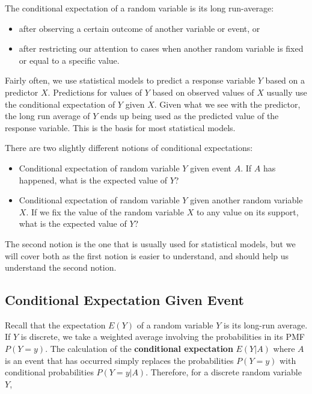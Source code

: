 \documentclass[
]{book}
\providecommand{\tightlist}{%
  \setlength{\itemsep}{0pt}\setlength{\parskip}{0pt}}
\begin{document}
The conditional expectation of a random variable is its long run-average:

\begin{itemize}
\tightlist
\item
  after observing a certain outcome of another variable or event, or
\item
  after restricting our attention to cases when another random variable is fixed or equal to a specific value.
\end{itemize}

Fairly often, we use statistical models to predict a response variable \(Y\) based on a predictor \(X\). Predictions for values of \(Y\) based on observed values of \(X\) usually use the conditional expectation of \(Y\) given \(X\). Given what we see with the predictor, the long run average of \(Y\) ends up being used as the predicted value of the response variable. This is the basis for most statistical models.

There are two slightly different notions of conditional expectations:

\begin{itemize}
\tightlist
\item
  Conditional expectation of random variable \(Y\) given event \(A\). If \(A\) has happened, what is the expected value of \(Y\)?
\item
  Conditional expectation of random variable \(Y\) given another random variable \(X\). If we fix the value of the random variable \(X\) to any value on its support, what is the expected value of \(Y\)?
\end{itemize}

The second notion is the one that is usually used for statistical models, but we will cover both as the first notion is easier to understand, and should help us understand the second notion.

\hypertarget{conditional-expectation-given-event}{%
\subsection{Conditional Expectation Given Event}\label{conditional-expectation-given-event}}

Recall that the expectation \(E(Y)\) of a random variable \(Y\) is its long-run average. If \(Y\) is discrete, we take a weighted average involving the probabilities in its PMF \(P(Y=y)\). The calculation of the \textbf{conditional expectation} \(E(Y|A)\) where \(A\) is an event that has occurred simply replaces the probabilities \(P(Y=y)\) with conditional probabilities \(P(Y=y|A)\). Therefore, for a discrete random variable \(Y\),
\end{document}
